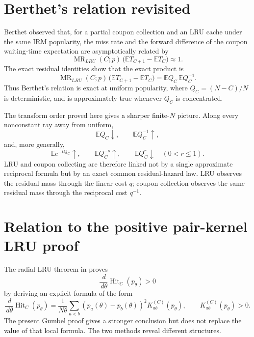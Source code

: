 \documentclass[11pt]{article}
\newcommand{\E}{\mathbb E}
\newcommand{\dd}{\,d}
\newcommand{\1}{\mathbf 1}
\newcommand{\MR}{\operatorname{MR}}
\newcommand{\Hit}{\operatorname{Hit}}
\begin{document}
\section{Berthet's relation revisited}

Berthet \cite{Berthet2017} observed that, for a partial coupon collection and an LRU
cache under the same IRM popularity, the miss rate and the forward difference of the
coupon waiting-time expectation are asymptotically related by
\[
        \MR_{LRU}(C;p)\,\bigl(\E T_{C+1}-\E T_C\bigr)\approx1.
\]
The exact residual identities show that the exact product is
\[
        \MR_{LRU}(C;p)\,\bigl(\E T_{C+1}-\E T_C\bigr)
        =\E Q_C\,\E Q_C^{-1}.
\]
Thus Berthet's relation is exact at uniform popularity, where $Q_C=(N-C)/N$ is
deterministic, and is approximately true whenever $Q_C$ is concentrated.

The transform order proved here gives a sharper finite-$N$ picture.  Along every
nonconstant ray away from uniform,
\[
        \E Q_C\downarrow,
        \qquad
        \E Q_C^{-1}\uparrow,
\]
and, more generally,
\[
        \E e^{-tQ_C}\uparrow,
        \qquad
        \E Q_C^{-s}\uparrow,
        \qquad
        \E Q_C^r\downarrow\quad(0<r\le1).
\]
LRU and coupon collecting are therefore linked not by a single approximate reciprocal
formula but by an exact common residual-hazard law.  LRU observes the residual mass
through the linear cost $q$; coupon collection observes the same residual mass through
the reciprocal cost $q^{-1}$.

\section{Relation to the positive pair-kernel LRU proof}

The radial LRU theorem in \cite{LongLRU2026} proves
\[
        \frac{\dd}{\dd\theta}\Hit_C(p_\theta)>0
\]
by deriving an explicit formula of the form
\[
        \frac{\dd}{\dd\theta}\Hit_C(p_\theta)
        =\frac{1}{N\theta}\sum_{a<b}(p_a(\theta)-p_b(\theta))^2
        K_{ab}^{(C)}(p_\theta),
        \qquad K_{ab}^{(C)}(p_\theta)>0.
\]
The present Gumbel proof gives a stronger conclusion but does not replace the value of
that local formula.  The two methods reveal different structures.
\end{document}
